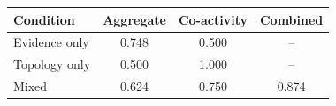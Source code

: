 \begin{tabular}{lccc}
\toprule
Condition & Aggregate & Co-activity & Combined \\
\midrule
Evidence only & 0.748 & 0.500 & -- \\
Topology only & 0.500 & 1.000 & -- \\
Mixed & 0.624 & 0.750 & 0.874 \\
\bottomrule
\end{tabular}
